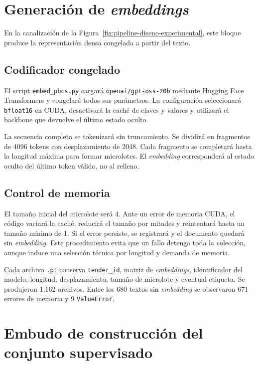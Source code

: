 \section{Generación de \textit{embeddings}}
\label{sec:generacion_embeddings}

En la canalización de la Figura~\ref{fig:pipeline-diseno-experimental}, este bloque produce la representación densa congelada a partir del texto.

\subsection{Codificador congelado}

El script \texttt{embed\_pbcs.py} cargará \texttt{openai/gpt-oss-20b} mediante Hugging Face Transformers y congelará todos sus parámetros. La configuración seleccionará \texttt{bfloat16} en CUDA, desactivará la caché de claves y valores y utilizará el backbone que devuelve el último estado oculto.

La secuencia completa se tokenizará sin truncamiento. Se dividirá en fragmentos de 4096 tokens con desplazamiento de 2048. Cada fragmento se completará hasta la longitud máxima para formar microlotes. El \textit{embedding} corresponderá al estado oculto del último token válido, no al relleno.

\subsection{Control de memoria}

El tamaño inicial del microlote será 4. Ante un error de memoria CUDA, el código vaciará la caché, reducirá el tamaño por mitades y reintentará hasta un tamaño mínimo de 1. Si el error persiste, se registrará y el documento quedará sin \textit{embedding}. Este procedimiento evita que un fallo detenga toda la colección, aunque induce una selección técnica por longitud y demanda de memoria.

Cada archivo \texttt{.pt} conserva \texttt{tender\_id}, matriz de \textit{embeddings}, identificador del modelo, longitud, desplazamiento, tamaño de microlote y eventual etiqueta. Se produjeron 1.162 archivos. Entre los 680 textos sin \textit{embedding} se observaron 671 errores de memoria y 9 \texttt{ValueError}.

\section{Embudo de construcción del conjunto supervisado}
\label{sec:embudo}

